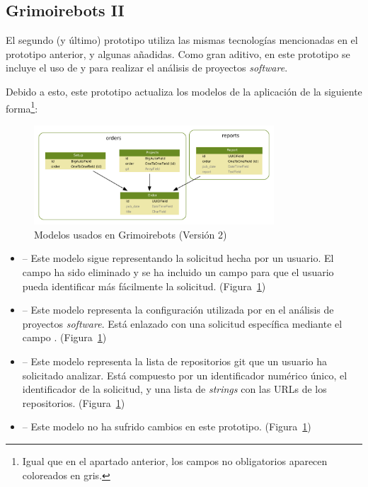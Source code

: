 \subsection{Grimoirebots II}

El segundo (y último) prototipo utiliza las mismas tecnologías mencionadas en el prototipo anterior, y algunas añadidas. Como gran aditivo, en este prototipo se incluye el uso de  y  para realizar el análisis de proyectos \emph{software}.

Debido a esto, este prototipo actualiza los modelos de la aplicación de la siguiente forma\footnote{Igual que en el apartado anterior, los campos no obligatorios aparecen coloreados en gris.}:

\begin{figure}[ht]
    \centering
    \includegraphics[width=0.8\textwidth]{Figures/grimoirebots_ii_models}
    \decoRule
    \caption[Grimoirebots II (modelos)]{Modelos usados en Grimoirebots (Versión 2)}
    \label{fig:grimoirebots_ii_models}
\end{figure}

\begin{itemize}
    \item {} -- Este modelo sigue representando la solicitud hecha por un usuario. El campo  ha sido eliminado y se ha incluido un campo  para que el usuario pueda identificar más fácilmente la solicitud. (Figura~\ref{fig:grimoirebots_ii_models})
    \item {} -- Este modelo representa la configuración utilizada por  en el análisis de proyectos \emph{software}. Está enlazado con una solicitud específica mediante el campo . (Figura~\ref{fig:grimoirebots_ii_models})
    \item {} -- Este modelo representa la lista de repositorios git que un usuario ha solicitado analizar. Está compuesto por un identificador numérico único, el identificador de la solicitud, y una lista de \emph{strings} con las URLs de los repositorios. (Figura~\ref{fig:grimoirebots_ii_models})
    \item {} -- Este modelo no ha sufrido cambios en este prototipo. (Figura~\ref{fig:grimoirebots_ii_models})
\end{itemize}

